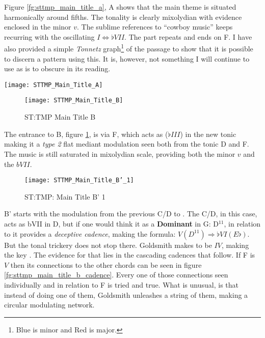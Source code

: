 Figure \ref{fg:sttmp_main_title_a}, A shows that the main theme is situated harmonically around fifths. The tonality is clearly mixolydian with evidence enclosed in the minor \(v\). The sublime references to ``cowboy music'' keeps recurring with the oscillating \(I \Leftrightarrow \flat{VII}\). The part repeats and ends on F. I have also provided a simple \textit{Tonnetz} graph\footnote{Blue is minor and Red is major.} of the passage to show that it is possible to discern a pattern using this. It is, however, not something I will continue to use as is to obscure in its reading. 

\begin{figure*}
\center
\texttt{[image: STTMP\_Main\_Title\_A]}
	\caption{ST:TMP: Main Title A}
	\label{fg:sttmp_main_title_a}
\end{figure*}


\begin{figure}[h!]
\center
\texttt{[image: STTMP\_Main\_Title\_B]}
	\caption{ST:TMP Main Title B}
	\label{fg:sttmp_main_title_b}
\end{figure}

The entrance to B, figure \ref{fg:sttmp_main_title_b}, is via F, which acts as (\(\flat{III}\)) in the new tonic making it a \textit{type 2} flat mediant modulation\parencite{lehman_hollywood_2013} seen both from the tonic D and F. The music is still saturated in mixolydian scale, providing both the minor \(v\) and the \(bVII\).

\begin{figure}[h!]
\center
\texttt{[image: STTMP\_Main\_Title\_B'\_1]}
	\caption{ST:TMP: Main Title B' 1}
	\label{fg:sttmp_main_title_b_1}
\end{figure}

B' starts with the modulation from the previous C/D  to \eflat. The C/D, in this case, acts as bVII in D, but if one would think it as a \textbf{Dominant} in G: D\(^{11}\), in relation to \eflat it provides a \textit{deceptive cadence}, making the formula: \(V(D^{11})\Rightarrow{\flat}VI(E{\flat})\). But the tonal trickery does not stop there. Goldsmith makes \eflat to be \(IV\), making the key \bflat. The evidence for that lies in the cascading cadences that follow. If F is \(V\) then its connections to the other chords can be seen in figure \ref{fg:sttmp_main_title_b_cadence}. Every one of those connections seen individually and in relation to F is tried and true. What is unusual, is that instead of doing one of them, Goldsmith unleashes a string of them, making a circular modulating network.

